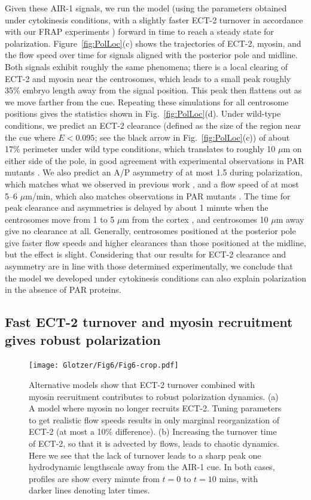 \documentclass[11pt]{article}
\begin{document}
Given these AIR-1 signals, we run the model (using the parameters obtained under cytokinesis conditions, with a slightly faster ECT-2 turnover in accordance with our FRAP experiments \cite[Fig.~3D]{longhini2022aurora}) forward in time to reach a steady state for polarization. Figure\ \ref{fig:PolLoc}(c) shows the trajectories of ECT-2, myosin, and the flow speed over time for signals aligned with the posterior pole and midline. Both signals exhibit roughly the same phenomena; there is a local clearing of ECT-2 and myosin near the centrosomes, which leads to a small peak roughly 35\% embryo length away from the signal position. This peak then flattens out as we move farther from the cue. Repeating these simulations for all centrosome positions gives the statistics shown in Fig.\ \ref{fig:PolLoc}(d). Under wild-type conditions, we predict an ECT-2 clearance (defined as the size of the region near the cue where $E < 0.095$; see the black arrow in Fig.\ \ref{fig:PolLoc}(c)) of about 17\% perimeter under wild type conditions, which translates to roughly 10 $\mu$m on either side of the pole, in good agreement with experimental observations in PAR mutants \cite[Fig.~2E]{gross2019guiding}. We also predict an A/P asymmetry of at most 1.5 during polarization, which matches what we observed in previous work \cite[Fig.~1]{longhini2022aurora}, and a flow speed of at most 5--6 $\mu$m/min, which also matches observations in PAR mutants \cite[Fig.~2G]{gross2019guiding}. The time for peak clearance and asymmetries is delayed by about 1 minute when the centrosomes move from 1 to 5 $\mu$m from the cortex \cite[Fig.~3F]{bienkowska2012centrosomes}, and centrosomes 10 $\mu$m away give no clearance at all. Generally, centrosomes positioned at the posterior pole give faster flow speeds and higher clearances than those positioned at the midline, but the effect is slight. Considering that our results for ECT-2 clearance and asymmetry are in line with those determined experimentally, we conclude that the model we developed under cytokinesis conditions can also explain polarization in the absence of PAR proteins.


\subsection{Fast ECT-2 turnover and myosin recruitment gives robust polarization \label{sec:EctTurn}}

\begin{figure}
\centering
\texttt{[image: Glotzer/Fig6/Fig6-crop.pdf]}
\caption{\label{fig:EctTurn}Alternative models show that ECT-2 turnover combined with myosin recruitment contributes to robust polarization dynamics. (a) A model where myosin no longer recruits ECT-2. Tuning parameters to get realistic flow speeds results in only marginal reorganization of ECT-2 (at most a 10\% difference). (b) Increasing the turnover time of ECT-2, so that it is advected by flows, leads to chaotic dynamics. Here we see that the lack of turnover leads to a sharp peak one hydrodynamic lengthscale away from the AIR-1 cue. In both cases, profiles are show every minute from $t=0$ to $t=10$ mins, with darker lines denoting later times.}
\end{figure}
\end{document}
